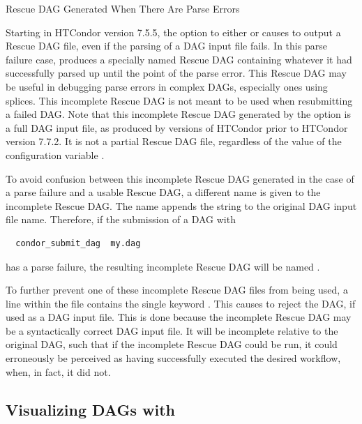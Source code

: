 \label{dagman:rescue_parse_error}
\begin{description}
\item[Rescue DAG Generated When There Are Parse Errors]
\end{description}

Starting in HTCondor version 7.5.5,
the  option to either  or 
causes  to output a Rescue DAG file, 
even if the parsing of a DAG input file fails.
In this parse failure case,  produces a specially 
named Rescue DAG containing whatever it had successfully parsed up
until the point of the parse error.
This Rescue DAG may be useful in debugging parse errors in complex DAGs,
especially ones using splices.
This incomplete Rescue DAG is not meant to be used when resubmitting
a failed DAG.  
Note that this incomplete Rescue DAG generated by the 
option is a full DAG input file, 
as produced by versions of HTCondor prior to HTCondor version 7.7.2.
It is not a partial Rescue DAG file,
regardless of the value of the configuration variable
.

To avoid confusion between this incomplete Rescue DAG
generated in the case of a parse failure and a usable Rescue DAG,
a different name is given to the incomplete Rescue DAG.
The name appends the string  to the original
DAG input file name.
Therefore, if the submission of a DAG with
\begin{verbatim}
  condor_submit_dag  my.dag
\end{verbatim}
has a parse failure, the resulting incomplete Rescue DAG will be
named .

To further prevent one of these incomplete Rescue DAG files from being used,
a line within the file contains the single keyword .
This causes  to reject the DAG, if used as a DAG input file.
This is done because the
incomplete Rescue DAG may be a syntactically correct DAG input file.
It will be incomplete relative to the original DAG,
such that if the incomplete Rescue DAG could be run,
it could erroneously be perceived as
having successfully executed the desired workflow, when, in fact,
it did not.

\subsection{Visualizing DAGs with }

